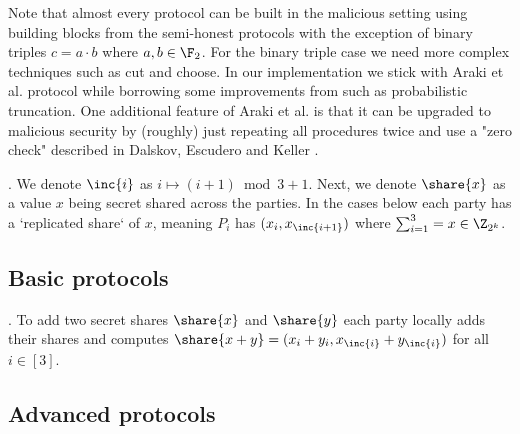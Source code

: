 Note that almost every protocol can be built in the malicious setting using
building blocks from the semi-honest protocols with the exception of binary
triples $c = a \cdot b$ where $a,b \in \F_2$. For the binary triple case we
need more complex techniques such as cut and choose. In our implementation we
stick with Araki et al. protocol \cite{CCS:AFLNO16} while borrowing some
improvements from \cite{cryptoeprint:2020:1330} such as probabilistic
truncation. One additional feature of Araki et al. \cite{CCS:AFLNO16} is that
it can be upgraded to malicious security by (roughly) just repeating all
procedures twice and use a "zero check" described in Dalskov, Escudero and
Keller \cite{cryptoeprint:2020:1330}.

. We denote $\inc{i}$ as $i \mapsto (i+1) \bmod 3 + 1$.
Next, we denote $\share{x}$ as a value $x$ being secret shared
across the parties. In the cases below each party has a `replicated share` of
$x$, meaning $P_i$ has $(x_i, x_{ \inc{i+1} })$ where $\sum_{i=1}^3 = x
\in \Z_{2^k}$.

\subsection{Basic protocols}
. To add two secret shares $\share{x}$ and $\share{y}$
each party locally adds their shares and computes $\share{x+y} =
(x_i + y_i, x_{\inc{i}} + y_{\inc{i}})$ for all $i \in [3]$.






\subsection{Advanced protocols}





